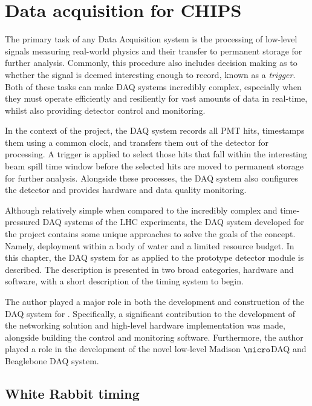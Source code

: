 \chapter{Data acquisition for CHIPS} %
\label{chap:daq} %

The primary task of any Data Acquisition system is the processing of low-level signals measuring
real-world physics and their transfer to permanent storage for further analysis. Commonly, this
procedure also includes decision making as to whether the signal is deemed interesting enough to
record, known as a \emph{trigger}. Both of these tasks can make DAQ systems incredibly complex,
especially when they must operate efficiently and resiliently for vast amounts of data in
real-time, whilst also providing detector control and monitoring.

In the context of the \chips project, the DAQ system records all PMT hits, timestamps them using a
common clock, and transfers them out of the detector for processing. A trigger is applied to
select those hits that fall within the interesting \numi beam spill time window before the
selected hits are moved to permanent storage for further analysis. Alongside these processes, the
DAQ system also configures the detector and provides hardware and data quality monitoring.

Although relatively simple when compared to the incredibly complex and time-pressured DAQ systems
of the LHC experiments, the DAQ system developed for the \chips project contains some unique
approaches to solve the goals of the \chips concept. Namely, deployment within a body of water and
a limited resource budget. In this chapter, the DAQ system for \chips as applied to the \chipsfive
prototype detector module is described. The description is presented in two broad categories,
hardware and software, with a short description of the timing system to begin.

The author played a major role in both the development and construction of the DAQ system for
\chipsfive. Specifically, a significant contribution to the development of the networking solution
and high-level hardware implementation was made, alongside building the control and monitoring
software. Furthermore, the author played a role in the development of the novel low-level Madison
$\micro$DAQ and Beaglebone DAQ system.

\section{White Rabbit timing} %
\label{sec:daq_timing} %

